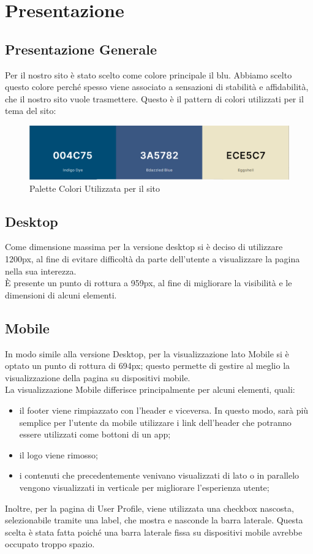 \section{Presentazione}

  \subsection{Presentazione Generale}
    Per il nostro sito è stato scelto come colore principale il blu. Abbiamo scelto questo colore perché spesso viene associato a sensazioni di stabilità e affidabilità, che il nostro sito vuole trasmettere. 
    Questo è il pattern di colori utilizzati per il tema del sito:
    \begin{figure}[h]
      \includegraphics[scale=0.8]{Images/Palette1.png}
      \caption{Palette Colori Utilizzata per il sito}
      \centering
    \end{figure}

  \subsection{Desktop}
    Come dimensione massima per la versione desktop si è deciso di utilizzare 1200px, al fine di evitare difficoltà da parte dell'utente a visualizzare la pagina nella sua interezza. \\
    È presente un punto di rottura a 959px, al fine di migliorare la visibilità e le dimensioni di alcuni elementi.

  \subsection{Mobile}
    In modo simile alla versione Desktop, per la visualizzazione lato Mobile si è optato un punto di rottura di 694px; questo permette di gestire al meglio la visualizzazione della pagina su dispositivi mobile. \\
    La visualizzazione Mobile differisce principalmente per alcuni elementi, quali:
    \begin{itemize}
      \item il footer viene rimpiazzato con l'header e viceversa. In questo modo, sarà più semplice per l'utente da mobile utilizzare i link dell'header che potranno essere utilizzati come bottoni di un app;
      \item il logo viene rimosso;
      \item i contenuti che precedentemente venivano visualizzati di lato o in parallelo vengono visualizzati in verticale per migliorare l'esperienza utente;
    \end{itemize}
    Inoltre, per la pagina di User Profile, viene utilizzata una checkbox nascosta, selezionabile tramite una label, che mostra e nasconde la barra laterale. Questa scelta è stata fatta poiché una barra
    laterale fissa su dispositivi mobile avrebbe occupato troppo spazio.
  
